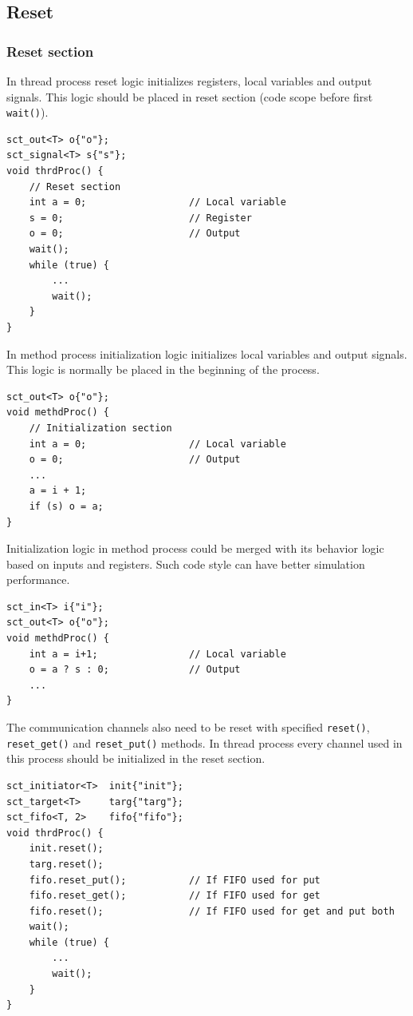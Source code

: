 \subsection{Reset}

\subsubsection{Reset section}

In thread process reset logic initializes registers, local variables and output signals. This logic should be placed in reset section (code scope before first {\tt wait()}).
\begin{lstlisting}[style=mycpp]
sct_out<T> o{"o"};
sct_signal<T> s{"s"};
void thrdProc() {
    // Reset section
    int a = 0;                  // Local variable
    s = 0;                      // Register 
    o = 0;                      // Output 
    wait();
    while (true) {
        ...
        wait(); 
    } 
}
\end{lstlisting}

In method process initialization logic initializes local variables and output signals. This logic is normally be placed in the beginning of the process.
\begin{lstlisting}[style=mycpp]
sct_out<T> o{"o"};
void methdProc() {
    // Initialization section
    int a = 0;                  // Local variable
    o = 0;                      // Output 
    ...
    a = i + 1;
    if (s) o = a;
}
\end{lstlisting}

Initialization logic in method process could be merged with its behavior logic based on inputs and registers. Such code style can have better simulation performance.
\begin{lstlisting}[style=mycpp]
sct_in<T> i{"i"};
sct_out<T> o{"o"};
void methdProc() {
    int a = i+1;                // Local variable
    o = a ? s : 0;              // Output 
    ...
}
\end{lstlisting}

The communication channels also need to be reset with specified {\tt reset()}, {\tt reset\_get()} and {\tt reset\_put()} methods. In thread process every channel used in this process should be initialized in the reset section.
\begin{lstlisting}[style=mycpp]
sct_initiator<T>  init{"init"};
sct_target<T>     targ{"targ"};
sct_fifo<T, 2>    fifo{"fifo"};
void thrdProc() {
    init.reset();
    targ.reset();
    fifo.reset_put();           // If FIFO used for put
    fifo.reset_get();           // If FIFO used for get
    fifo.reset();               // If FIFO used for get and put both
    wait();
    while (true) {
        ...
        wait(); 
    } 
}
\end{lstlisting}

